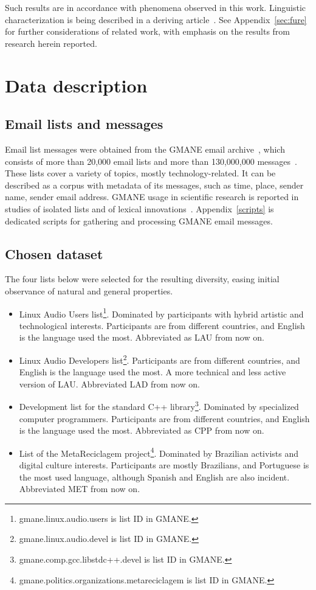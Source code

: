 \documentclass[%
 aip,
 jmp,%
 amsmath,amssymb,
 reprint,%
]{revtex4-1}
\begin{document}
 Such results are in accordance with phenomena observed in this work. Linguistic characterization is being described in a deriving article~\cite{rcText}. See Appendix~\ref{sec:fure} for further considerations of related work, with emphasis on the results from research herein reported.

\section{Data description}
    \subsection{Email lists and messages}
Email list messages were obtained from
the GMANE email archive~\cite{GMANE}, which consists of more than 20,000 email lists and more than 130,000,000 messages~\cite{GMANEwikipedia}. These lists cover a variety of topics, mostly technology-related. It can be described as a corpus with metadata of its messages, such as time, place, sender name, sender email address.
GMANE usage in scientific research is reported in studies of isolated lists and of lexical innovations~\cite{GMANE2,bird}. Appendix~\ref{scripts} is dedicated scripts for gathering and processing GMANE email messages.

    \subsection{Chosen dataset}
The four lists below were selected for the resulting diversity, easing initial observance of natural and general properties.
\begin{itemize}
    \item Linux Audio Users list\footnote{gmane.linux.audio.users is list ID in GMANE.}. Dominated by participants with hybrid artistic and technological interests. Participants are from different countries, and English is the language used the most. Abbreviated as LAU from now on.
    \item Linux Audio Developers list\footnote{gmane.linux.audio.devel is list ID in GMANE.}. Participants are from different countries, and English is the language used the most. A more technical and less active version of LAU. Abbreviated LAD from now on.
    \item Development list for the standard C++ library\footnote{gmane.comp.gcc.libstdc++.devel is list ID in GMANE.}. Dominated by specialized computer programmers. Participants are from different countries, and English is the language used the most. Abbreviated as CPP from now on.
    \item List of the MetaReciclagem project\footnote{gmane.politics.organizations.metareciclagem is list ID in GMANE.}. Dominated by Brazilian activists and digital culture interests. Participants are mostly Brazilians, and Portuguese is the most used language, although Spanish and English are also incident. Abbreviated MET from now on.
\end{itemize} 
\end{document}
